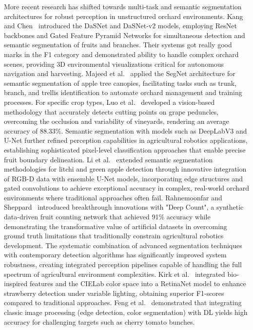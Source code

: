 \documentclass{ieeeaccess}
\begin{document}
More recent research has shifted towards multi-task and semantic segmentation architectures for robust perception in unstructured orchard environments. Kang and Chen~\cite{kang2019fruit, kang2020fruit} introduced the DaSNet and DaSNet-v2 models, employing ResNet backbones and Gated Feature Pyramid Networks for simultaneous detection and semantic segmentation of fruits and branches. Their systems got really good marks in the F1 category and demonstrated ability to handle complex orchard scenes, providing 3D environmental visualizations critical for autonomous navigation and harvesting. Majeed et al.~\cite{majeed2020deep} applied the SegNet architecture for semantic segmentation of apple tree canopies, facilitating tasks such as trunk, branch, and trellis identification to automate orchard management and training processes.
For specific crop types, 
Luo et al.~\cite{luo2018vision} developed a vision-based methodology that accurately detects cutting points on grape peduncles, overcoming the occlusion and variability of vineyards, rendering an average accuracy of 88.33\%.
Semantic segmentation with models such as DeepLabV3 and U-Net further refined perception capabilities in agricultural robotics applications, establishing sophisticated pixel-level classification approaches that enable precise fruit boundary delineation. Li et al.~\cite{li2020detection, li2021novel} extended semantic segmentation methodologies for litchi and green apple detection through innovative integration of RGB-D data with ensemble U-Net models, incorporating edge structures and gated convolutions to achieve exceptional accuracy in complex, real-world orchard environments where traditional approaches often fail. Rahnemoonfar and Sheppard~\cite{rahnemoonfar2017deep} introduced breakthrough innovations with "Deep Count", a synthetic data-driven fruit counting network that achieved 91\% accuracy while demonstrating the transformative value of artificial datasets in overcoming ground truth limitations that traditionally constrain agricultural robotics development. The systematic combination of advanced segmentation techniques with contemporary detection algorithms has significantly improved system robustness, creating integrated perception pipelines capable of handling the full spectrum of agricultural environment complexities. 
Kirk et al.~\cite{kirk2020b} integrated bio-inspired features and the CIELab color space into a RetinaNet model to enhance strawberry detection under variable lighting, obtaining superior F1-scores compared to traditional approaches. 
Feng et al.~\cite{feng2018} demonstrated that integrating classic image processing (edge detection, color segmentation) with DL yields high accuracy for challenging targets such as cherry tomato bunches.
\end{document}
